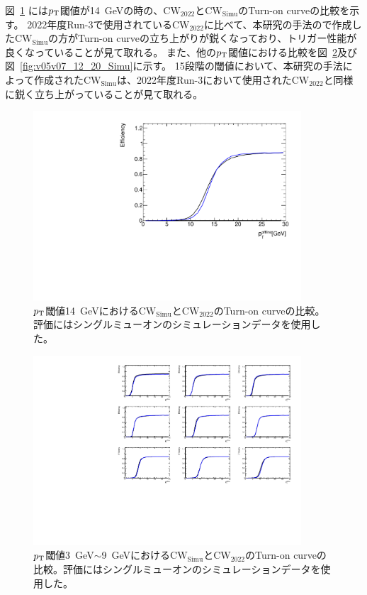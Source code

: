 図~\ref{fig:v05v07} には$p_{\rm{T}}$閾値が14~GeVの時の、$\mathrm{CW_{2022}}$と$\mathrm{CW_{Simu}}$のTurn-on curveの比較を示す。
2022年度Run-3で使用されている$\mathrm{CW_{2022}}$に比べて、本研究の手法ので作成した$\mathrm{CW_{Simu}}$の方がTurn-on curveの立ち上がりが鋭くなっており、トリガー性能が良くなっていることが見て取れる。
また、他の$p_{\rm{T}}$閾値における比較を図~\ref{fig:v05v07_1_9_Simu}及び図~\ref{fig:v05v07_12_20_Simu}に示す。
15段階の閾値において、本研究の手法によって作成された$\mathrm{CW_{Simu}}$は、2022年度Run-3において使用された$\mathrm{CW_{2022}}$と同様に鋭く立ち上がっていることが見て取れる。
\begin{figure}[htb]
  \centering
  \includegraphics[clip, width=10cm]{fig/5/v05vsv07_MU14.pdf}
  \caption{$p_{\rm{T}}$閾値14~GeVにおける$\mathrm{CW_{Simu}}$と$\mathrm{CW_{2022}}$のTurn-on curveの比較。評価にはシングルミューオンのシミュレーションデータを使用した。}
  \label{fig:v05v07}
\end{figure}

\begin{figure}[htb]
  \centering
  \includegraphics[clip, width=10cm]{fig/5/v05v07_1_9.pdf}
  \caption{$p_{\rm{T}}$閾値3~GeV$\sim$9~GeVにおける$\mathrm{CW_{Simu}}$と$\mathrm{CW_{2022}}$のTurn-on curveの比較。評価にはシングルミューオンのシミュレーションデータを使用した。}
  \label{fig:v05v07_1_9_Simu}
\end{figure}

